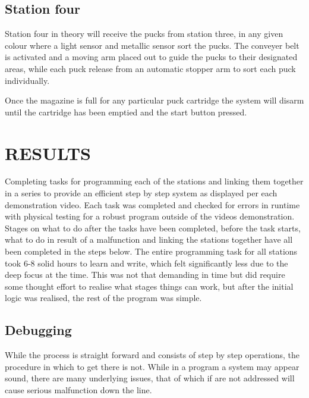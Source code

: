 \documentclass[a4paper, 10pt,  conference]{article}
\begin{document}
\subsection{Station four}
Station four in theory will receive the pucks from station three, in any given colour where a light sensor and metallic sensor sort the pucks. The conveyer belt is activated and a moving arm placed out to guide the pucks to their designated areas, while each puck release from an automatic stopper arm to sort each puck individually. 

Once the magazine is full for any particular puck cartridge the system will disarm until the cartridge has been emptied and the start button pressed.




\section{RESULTS}
Completing tasks for programming each of the stations and linking them together in a series to provide an efficient step by step system as displayed per each demonstration video. Each task was completed and checked for errors in runtime with physical testing for a robust program outside of the videos demonstration. Stages on what to do after  the tasks have been completed, before the task starts, what to do in result of a malfunction and linking the stations together have all been completed in the steps below. The entire programming task for all stations took 6-8 solid hours to learn and write, which felt significantly less due to the deep focus at the time. This was not that demanding in time but did require some thought effort to realise what stages things can work, but after the initial logic was realised, the rest of the program was simple.



\subsection{Debugging} 
While the process is straight forward and consists of step by step operations, the procedure in which to get there is not. While in a program a system may appear sound, there are many underlying issues, that of which if are not addressed will cause serious malfunction down the line. 
\end{document}
